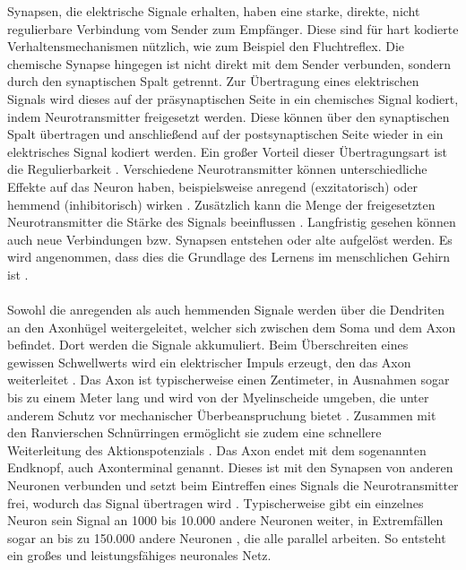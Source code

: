 Synapsen, die elektrische Signale erhalten, haben eine starke, direkte, nicht regulierbare Verbindung vom Sender zum Empfänger. Diese sind für hart kodierte Verhaltensmechanismen nützlich, wie zum Beispiel den Fluchtreflex. Die chemische Synapse hingegen ist nicht direkt mit dem Sender verbunden, sondern durch den synaptischen Spalt getrennt. Zur Übertragung eines elektrischen Signals wird dieses auf der präsynaptischen Seite in ein chemisches Signal kodiert, indem Neurotransmitter freigesetzt werden. Diese können über den synaptischen Spalt übertragen und anschließend auf der postsynaptischen Seite wieder in ein elektrisches Signal kodiert werden. Ein großer Vorteil dieser Übertragungsart ist die Regulierbarkeit \cite{kriesel2008kleiner}. Verschiedene Neurotransmitter können unterschiedliche Effekte auf das Neuron haben, beispielsweise anregend (exzitatorisch) oder hemmend (inhibitorisch) wirken \cite{kirschbaum2008biopsychologie}. Zusätzlich kann die Menge der freigesetzten Neurotransmitter die Stärke des Signals beeinflussen \cite{kriesel2008kleiner}. Langfristig gesehen können auch neue Verbindungen bzw. Synapsen entstehen oder alte aufgelöst werden. Es wird angenommen, dass dies die Grundlage des Lernens im menschlichen Gehirn ist \cite{russell2013kunstliche}.
\\\\
Sowohl die anregenden als auch hemmenden Signale werden über die Dendriten an den Axonhügel weitergeleitet, welcher sich zwischen dem Soma und dem Axon befindet. Dort werden die Signale akkumuliert. Beim Überschreiten eines gewissen Schwellwerts wird ein elektrischer Impuls erzeugt, den das Axon weiterleitet \cite{kirschbaum2008biopsychologie}. Das Axon ist typischerweise einen Zentimeter, in Ausnahmen sogar bis zu einem Meter lang und wird von der Myelinscheide umgeben, die unter anderem Schutz vor mechanischer Überbeanspruchung bietet \cite{russell2013kunstliche}. Zusammen mit den Ranvierschen Schnürringen ermöglicht sie zudem eine schnellere Weiterleitung des Aktionspotenzials \cite{kirschbaum2008biopsychologie}. Das Axon endet mit dem sogenannten Endknopf, auch Axonterminal genannt. Dieses ist mit den Synapsen von anderen Neuronen verbunden und setzt beim Eintreffen eines Signals die Neurotransmitter frei, wodurch das Signal übertragen wird \cite{kirschbaum2008biopsychologie}. Typischerweise gibt ein einzelnes Neuron sein Signal an 1000 bis 10.000 andere Neuronen weiter, in Extremfällen sogar an bis zu 150.000 andere Neuronen \cite{zell2003simulation}, die alle parallel arbeiten. So entsteht ein großes und leistungsfähiges neuronales Netz. 

